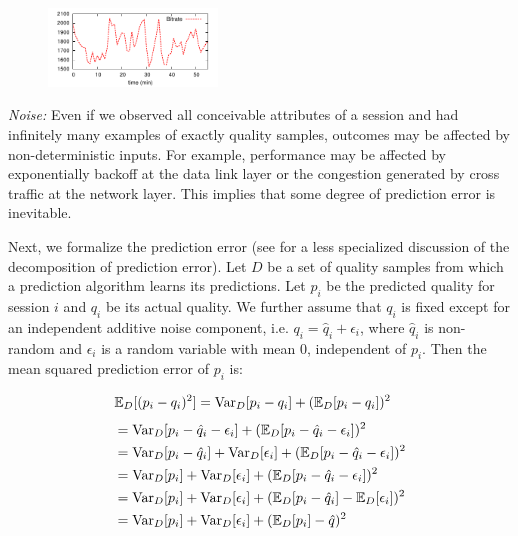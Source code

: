 \begin{packedenumerate}
\begin{figure}[h!]
\centering
 \includegraphics[width=0.4\textwidth] {figures/quality-time.pdf}
\label{fig:quality-variability}
\end{figure}

  \item \emph{Noise:} Even if we observed all conceivable attributes of a session and had infinitely many examples of exactly quality samples, outcomes may be affected by non-deterministic inputs.  For example, performance may be affected by exponentially backoff at the data link layer or the congestion generated by cross traffic at the network layer. This implies that some degree of prediction error is inevitable.
\end{packedenumerate}

Next, we formalize the prediction error (see \cite{domingos2000unified} for a less specialized discussion of the decomposition of prediction error).  Let $D$ be a set of quality samples from which a prediction algorithm learns its predictions.  Let $p_i$ be the predicted quality for session $i$ and $q_i$ be its actual quality.  We further assume that $q_i$ is fixed except for an independent additive noise component, i.e. $q_i = \hat{q}_i + \epsilon_i$, where $\hat{q}_i$ is non-random and $\epsilon_i$ is a random variable with mean $0$, independent of $p_i$.  Then the mean squared prediction error of $p_i$ is:

\begin{align}
  \label{eqn:biasvariance}
  \operatorname{\mathbb{E}}_D[(p_i - q_i)^2] &= \operatorname{\text{Var}}_D[p_i - q_i] + (\operatorname{\mathbb{E}}_D[p_i - q_i])^2
\end{align}
\begin{align*}
  \label{eqn:biasvariancelong}
  &= \operatorname{\text{Var}}_D[p_i - \hat{q}_i - \epsilon_i] + (\operatorname{\mathbb{E}}_D[p_i - \hat{q}_i - \epsilon_i])^2 \\
  &= \operatorname{\text{Var}}_D[p_i - \hat{q}_i] + \operatorname{\text{Var}}_D[\epsilon_i] + (\operatorname{\mathbb{E}}_D[p_i - \hat{q}_i - \epsilon_i])^2\\
  &= \operatorname{\text{Var}}_D[p_i] + \operatorname{\text{Var}}_D[\epsilon_i] + (\operatorname{\mathbb{E}}_D[p_i - \hat{q}_i - \epsilon_i])^2\\
  &= \operatorname{\text{Var}}_D[p_i] + \operatorname{\text{Var}}_D[\epsilon_i] + (\operatorname{\mathbb{E}}_D[p_i - \hat{q}_i] - \operatorname{\mathbb{E}}_D[\epsilon_i])^2\\
  &= \operatorname{\text{Var}}_D[p_i] + \operatorname{\text{Var}}_D[\epsilon_i] + (\operatorname{\mathbb{E}}_D[p_i] - \hat{q})^2
\end{align*}

